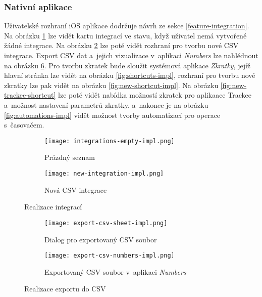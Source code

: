 \subsubsection{Nativní aplikace}

Uživatelské rozhraní iOS aplikace dodržuje návrh ze sekce \ref{feature-integration}. Na obrázku \ref{fig:integrations-empty-impl} lze vidět kartu integrací ve stavu, když uživatel nemá vytvořené žádné integrace. Na obrázku \ref{fig:new-integration-impl} lze poté vidět rozhraní pro tvorbu nové CSV integrace. Export CSV dat a~jejich vizualizace v~aplikaci \emph{Numbers} lze nahlédnout na obrázku \ref{fig:export-csv-impl}. Pro tvorbu zkratek bude sloužit systémová aplikace \emph{Zkratky}, jejíž hlavní stránka lze vidět na obrázku \ref{fig:shortcuts-impl}, rozhraní pro tvorbu nové zkratky lze pak vidět na obrázku \ref{fig:new-shortcut-impl}. Na obrázku \ref{fig:new-trackee-shortcut} lze poté vidět nabídka možností zkratek pro aplikaace Trackee a~možnost nastavení parametrů zkratky. a~nakonec je na obrázku \ref{fig:automations-impl} vidět možnost tvorby automatizací pro operace s~časovačem.

\begin{figure}[p]
    \centering
    \begin{subfigure}[b]{0.4\textwidth}
		\centering
		\texttt{[image: integrations-empty-impl.png]}
		\caption{Prázdný seznam}
		\label{fig:integrations-empty-impl}
	\end{subfigure}
	\hspace{2cm}
	\begin{subfigure}[b]{0.4\textwidth}
		\centering
		\texttt{[image: new-integration-impl.png]}
		\caption{Nová CSV integrace}
		\label{fig:new-integration-impl}
	\end{subfigure}
	\caption{Realizace integrací}
	\label{fig:integrations-impl}
\end{figure}

\begin{figure}[p]
    \centering
    \begin{subfigure}[b]{0.4\textwidth}
		\centering
		\texttt{[image: export-csv-sheet-impl.png]}
		\caption{Dialog pro exportovaný CSV soubor}
		\label{fig:export-csv-sheet-impl}
	\end{subfigure}
	\hspace{2cm}
	\begin{subfigure}[b]{0.4\textwidth}
		\centering
		\texttt{[image: export-csv-numbers-impl.png]}
		\caption{Exportovaný CSV soubor v~aplikaci \emph{Numbers}}
		\label{fig:export-csv-numbers-impl}
	\end{subfigure}
	\caption{Realizace exportu do CSV}
	\label{fig:export-csv-impl}
\end{figure}

